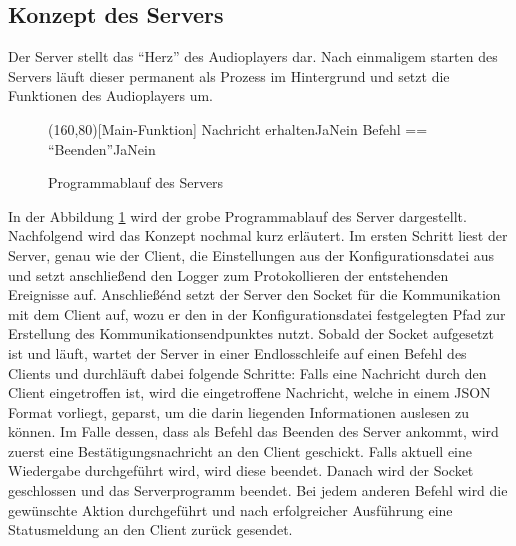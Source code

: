 \subsection{Konzept des Servers}

Der Server stellt das \enquote{Herz} des Audioplayers dar. Nach einmaligem
starten des Servers läuft dieser permanent als Prozess im Hintergrund und
setzt die Funktionen des Audioplayers um.

\begin{figure}[H]
    \begin{struktogramm}(160,80)[Main-Funktion] 
        	 {Nachricht erhalten}{Ja}{Nein}
        	     {Befehl == \enquote{Beenden}}{Ja}{Nein}
        	    	\change
        	    \ifend
        		\change
        	\ifend
        \whileend
    \end{struktogramm} 
\caption{Programmablauf des Servers} 
\label{lst:server_ablauf} 
\end{figure}

In der Abbildung \ref{lst:server_ablauf} wird der grobe Programmablauf des
Server dargestellt. Nachfolgend wird das Konzept nochmal kurz erläutert.
\newline
Im ersten Schritt liest der Server, genau wie der Client, die
Einstellungen aus der Konfigurationsdatei aus und setzt anschließend den Logger
zum Protokollieren der entstehenden Ereignisse auf. Anschließénd setzt der
Server den Socket für die Kommunikation mit dem Client auf, wozu er den in der
Konfigurationsdatei festgelegten Pfad zur Erstellung des
Kommunikationsendpunktes nutzt. Sobald der Socket aufgesetzt ist und läuft,
wartet der Server in einer Endlosschleife auf einen Befehl des Clients und
durchläuft dabei folgende Schritte: \newline
Falls eine Nachricht durch den Client eingetroffen ist, wird die
eingetroffene Nachricht, welche in einem \ac{JSON} Format vorliegt,
geparst, um die darin liegenden Informationen auslesen zu können. Im Falle
dessen, dass als Befehl das Beenden des Server ankommt, wird zuerst eine
Bestätigungsnachricht an den Client geschickt. Falls aktuell eine Wiedergabe
durchgeführt wird, wird diese beendet. Danach wird der Socket geschlossen und
das Serverprogramm beendet. Bei jedem anderen Befehl wird die gewünschte Aktion
durchgeführt und nach erfolgreicher Ausführung eine Statusmeldung an den Client
zurück gesendet.
	

